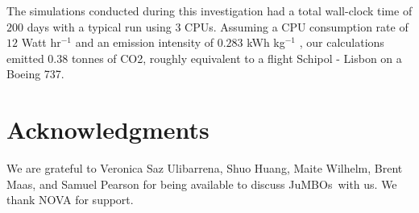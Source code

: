 \documentclass[submission,phys]{lib/SciPost}
\newcommand{\jumbos}{\mbox{JuMBOs}}
\begin{document}
The simulations conducted during this investigation had a total
wall-clock time of $200$ days with a typical run using $3$ CPUs. 
Assuming a CPU consumption rate of $12$ Watt hr$^{-1}$ and an emission 
intensity of $0.283$ kWh kg$^{-1}$ \cite{doi:10.1002/cpe.3489}, 
our calculations emitted $0.38$ tonnes of
CO2, roughly equivalent to a flight Schipol - Lisbon on a Boeing 737.

\section*{Acknowledgments}
We are grateful to Veronica Saz Ulibarrena, Shuo Huang, Maite Wilhelm,
Brent Maas, and Samuel Pearson for being available to discuss \jumbos\, 
with us. We thank NOVA for support.


%
\end{document}
